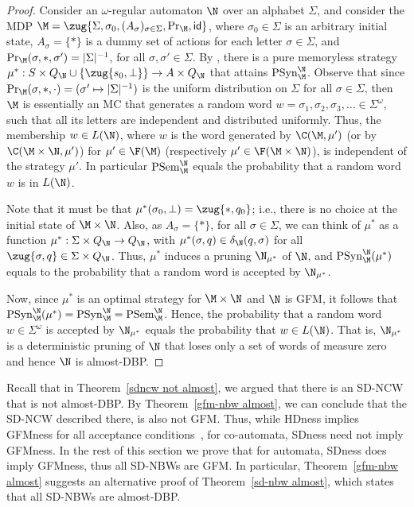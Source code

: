 \documentclass{lmcs}
\newcommand{\set}[1]{\{ #1 \}}
\begin{document}
\begin{proof}
	Consider an $\omega$-regular automaton $\N$ over an alphabet $\Sigma$, and consider the MDP $\M=\zug{\Sigma,\sigma_0,(A_\sigma)_{\sigma\in\Sigma},\Pr_{\M},\mathsf{id}}$, where $\sigma_0\in \Sigma$ is an arbitrary initial state, $A_\sigma=\set{\ast}$ is a dummy set of actions for each letter $\sigma\in \Sigma$, and $\Pr_{\M}(\sigma,\ast,\sigma')=|\Sigma|^{-1}$, for all $\sigma,\sigma'\in\Sigma$. By \cite{CJH03}, there is a pure memoryless strategy $\mu^*:S\times Q_\N\cup\set{\zug{s_0,\bot}}\rightarrow A\times Q_\N$ that attains $\mathrm{PSyn}^\N_\M$. Observe that since $\Pr_{\M}(\sigma,\ast,\cdot)=(\sigma'\mapsto |\Sigma|^{-1})$ is the uniform distribution on $\Sigma$ for all $\sigma\in \Sigma$, then $\M$ is essentially an MC that generates a random word $w=\sigma_1,\sigma_2,\sigma_3,\ldots\in \Sigma^\omega$, such that all its letters are independent and distributed uniformly. Thus, the membership $w\in L(\N)$, where $w$ is the word generated by $\C(\M,\mu')$ (or by $\C(\M\times \N,\mu')$) for $\mu'\in \F(\M)$ (respectively $\mu'\in \F(\M\times \N)$), is independent of the strategy $\mu'$. In particular $\mathrm{PSem}^\N_\M$ equals the probability that a random word $w$ is in $L(\N)$. 
	
	Note that it must be that $\mu^*(\sigma_0,\bot)=\zug{\ast,q_0}$; i.e., there is no choice at the initial state of $\M\times \N$. Also, as $A_\sigma=\set{\ast}$, for all $\sigma\in \Sigma$, we can think of $\mu^*$ as a function $\mu^*:\Sigma\times Q_\N\rightarrow Q_\N$, with $\mu^*(\sigma,q)\in \delta_\N(q,\sigma)$ for all $\zug{\sigma,q}\in \Sigma\times Q_\N$. Thus, $\mu^*$ induces a pruning $\N_{\mu^*}$ of $\N$, and $\mathrm{PSyn}^\N_\M(\mu^*)$ equals to the probability that a random word is accepted by $\N_{\mu^*}$. 
	
	Now, since $\mu^*$ is an optimal strategy for $\M\times \N$ and $\N$ is GFM, it follows that $\mathrm{PSyn}^\N_\M(\mu^*)=\mathrm{PSyn}^\N_\M=\mathrm{PSem}^\N_\M$. Hence, the probability that a random word $w\in \Sigma^\omega$ is accepted by $\N_{\mu^*}$ equals the probability that $w\in L(\N)$. That is, $\N_{\mu^*}$ is a deterministic pruning of $\N$ that loses only a set of words of measure zero and hence $\N$ is almost-DBP.
\end{proof}

Recall that in Theorem~\ref{sdncw not almost}, we argued that there is an SD-NCW that is not almost-DBP. By Theorem~\ref{gfm-nbw almost}, we can conclude that the SD-NCW described there, is also not GFM. 
Thus, while HDness implies GFMness for all acceptance conditions~\cite{KMBK14}, for co-\buchi automata, SDness need not imply GFMness. 
In the rest of this section we prove that for \buchi automata, SDness does imply GFMness, thus all SD-NBWs are GFM. In particular, Theorem~\ref{gfm-nbw almost} suggests an alternative proof of Theorem~\ref{sd-nbw almost}, which states that all SD-NBWs are almost-DBP.
\end{document}

